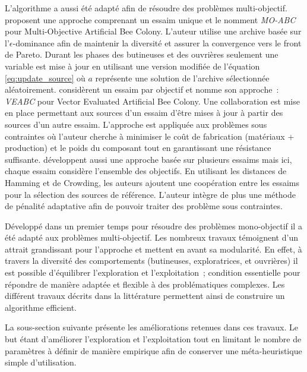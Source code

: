 L’algorithme a aussi été adapté afin de résoudre des problèmes multi-objectif.
\textcite{Akbari201239} proposent une approche comprenant un essaim unique et le nomment
\textit{MO-ABC} pour Multi-Objective Artificial Bee Colony. L’auteur utilise une archive
basée sur l’$\epsilon$-dominance afin de maintenir la diversité et assurer la convergence
vers le front de Pareto. Durant les phases des butineuses et des ouvrières seulement une
variable est mise à jour en utilisant une version modifiée de l’équation
\eqref{eq:update_source} où $a$ représente une solution de l’archive sélectionnée
aléatoirement.
\textcite{Omkar2011489} considèrent un essaim par objectif et nomme son approche~: \textit{VEABC}
pour Vector Evaluated Artificial Bee Colony. Une collaboration est mise en place
permettant aux sources d’un essaim d’être mises à jour à partir des sources d’un autre
essaim. L’approche est appliquée aux problèmes sous contraintes où l’auteur cherche à
minimiser le coût de fabrication (matériaux + production) et le poids du composant tout en
garantissant une résistance suffisante.
\textcite{Zhang20121} développent aussi une approche basée sur plusieurs essaims mais ici,
chaque essaim considère l’ensemble des objectifs. En utilisant les distances de Hamming et
de Crowding, les auteurs ajoutent une coopération entre les essaims pour la sélection des
sources de référence. L’auteur intègre de plus une méthode de pénalité adaptative
\parencite{Woldesenbet20073077} afin de pouvoir traiter des problème sous contraintes.

Développé dans un premier temps pour résoudre des problèmes mono-objectif il a été adapté
aux problèmes multi-objectif. Les nombreux travaux témoignent d’un attrait grandissant
pour l’approche et mettent en avant sa modularité. En effet, à travers la diversité des
comportements (butineuses, exploratrices, et ouvrières) il est possible d’équilibrer
l’exploration et l’exploitation~; condition essentielle pour répondre de manière adaptée
et flexible à des problématiques complexes. Les différent travaux décrits dans la
littérature permettent ainsi de construire un algorithme efficient.

La sous-section suivante présente les améliorations retenues dans ces travaux.
Le but étant d’améliorer l’exploration et l’exploitation tout en limitant le
nombre de paramètres à définir de manière empirique afin de conserver une
méta-heuristique simple d’utilisation.



